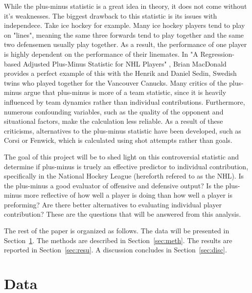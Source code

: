 \documentclass[12pt]{article}
\begin{document}
While the plus-minus statistic is a great idea in theory, it does not come without it's weaknesses. The biggest drawback to this
statistic is its issues with independece. Take ice hockey for example. Many ice hockey players tend to play on "lines", meaning the same three 
forwards tend to play together and the same two defensemen usually play together. As a result, the performance of one player is highly dependent 
on the performance of their linemates. In "A Regression-based Adjusted Plus-Minus Statistic for NHL Players" \cite{Macdonald_2011}, Brian
MacDonald provides a perfect example of this with the Henrik and Daniel Sedin, Swedish twins who played together for the Vancouver Canucks. 
 \cite[Daniel spent 92\% of his playing time with Henrik, the highest percentage of any other player combination where both players have
played over 700 minutes. Because of this high colinearity between the twins, it is difficult to separate the individual effect that each 
player has on the net goals scored on the ice.]{Macdonald_2012} Many critics of the plus-minus argue that plus-minus is more of a team 
statistic, since it is heavily influenced by team dynamics rather than individual contributions. Furthermore, numerous confounding variables, 
such as the quality of the opponent and situational factors, make the calculation less reliable. As a result of these criticisms, alternatives 
to the plus-minus statistic have been developed, such as Corsi or Fenwick, which is calculated using shot attempts rather than goals.

The goal of this project will be to shed light on this controversial statistic and determine if plus-minus is truely an effective predictor
to individual contribution, specifically in the National Hockey League (hereforth refered to as the NHL). Is the plus-minus a good evaluator 
of offensive and defensive output? Is the plus-minus more reflective of how well a player is doing than how well a player is preforming? 
Are there better alternatives to evaluating individual player contribution? These are the questions that will be answered from this analysis.


The rest of the paper is organized as follows.
The data will be presented in Section~\ref{sec:data}.
The methods are described in Section~\ref{sec:meth}.
The results are reported in Section~\ref{sec:resu}.
A discussion concludes in Section~\ref{sec:disc}.


\section{Data}
\label{sec:data}
\end{document}
